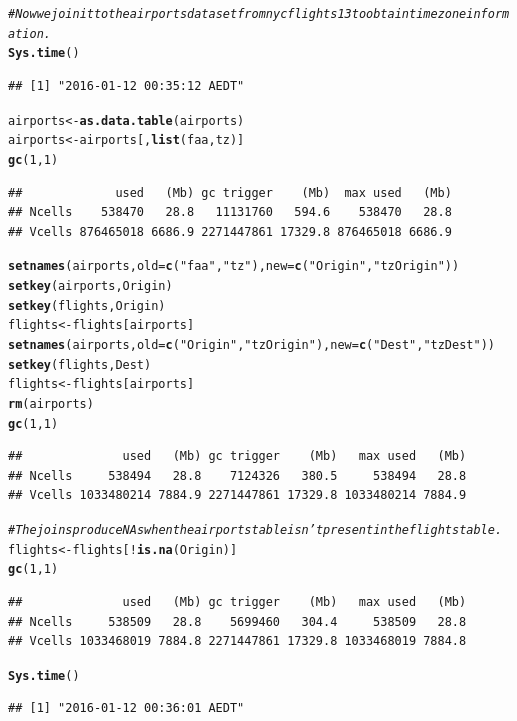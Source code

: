 \documentclass{scrreprt}\usepackage[]{graphicx}\usepackage[]{color}
\makeatletter
\newcommand{\hlnum}[1]{\textcolor[rgb]{0.686,0.059,0.569}{#1}}%
\newcommand{\hlstr}[1]{\textcolor[rgb]{0.192,0.494,0.8}{#1}}%
\newcommand{\hlcom}[1]{\textcolor[rgb]{0.678,0.584,0.686}{\textit{#1}}}%
\newcommand{\hlopt}[1]{\textcolor[rgb]{0,0,0}{#1}}%
\newcommand{\hlstd}[1]{\textcolor[rgb]{0.345,0.345,0.345}{#1}}%
\newcommand{\hlkwb}[1]{\textcolor[rgb]{0.69,0.353,0.396}{#1}}%
\newcommand{\hlkwc}[1]{\textcolor[rgb]{0.333,0.667,0.333}{#1}}%
\newcommand{\hlkwd}[1]{\textcolor[rgb]{0.737,0.353,0.396}{\textbf{#1}}}%
\newenvironment{kframe}{%
 \def\at@end@of@kframe{}%
 \ifinner\ifhmode%
  \def\at@end@of@kframe{\end{minipage}}%
  \begin{minipage}{\columnwidth}%
 \fi\fi%
 \def\FrameCommand##1{\hskip\@totalleftmargin \hskip-\fboxsep
 \colorbox{shadecolor}{##1}\hskip-\fboxsep
     \hskip-\linewidth \hskip-\@totalleftmargin \hskip\columnwidth}%
 \MakeFramed {\advance\hsize-\width
   \@totalleftmargin\z@ \linewidth\hsize
   \@setminipage}}%
 {\par\unskip\endMakeFramed%
 \at@end@of@kframe}
\newenvironment{knitrout}{}{} %
\makeatother
\begin{document}
\begin{knitrout}
\color{fgcolor}\begin{kframe}
\begin{alltt}
\hlcom{# Now we join it to the airports dataset from nycflights13 to obtain time zone information.}
\hlkwd{Sys.time}\hlstd{()}
\end{alltt}
\begin{verbatim}
## [1] "2016-01-12 00:35:12 AEDT"
\end{verbatim}
\begin{alltt}
\hlstd{airports} \hlkwb{<-} \hlkwd{as.data.table}\hlstd{(airports)}
\hlstd{airports} \hlkwb{<-} \hlstd{airports[,}\hlkwd{list}\hlstd{(faa, tz)]}
\hlkwd{gc}\hlstd{(}\hlnum{1}\hlstd{,}\hlnum{1}\hlstd{)}
\end{alltt}
\begin{verbatim}
##             used   (Mb) gc trigger    (Mb)  max used   (Mb)
## Ncells    538470   28.8   11131760   594.6    538470   28.8
## Vcells 876465018 6686.9 2271447861 17329.8 876465018 6686.9
\end{verbatim}
\begin{alltt}
\hlkwd{setnames}\hlstd{(airports,} \hlkwc{old} \hlstd{=} \hlkwd{c}\hlstd{(}\hlstr{"faa"}\hlstd{,} \hlstr{"tz"}\hlstd{),} \hlkwc{new} \hlstd{=} \hlkwd{c}\hlstd{(}\hlstr{"Origin"}\hlstd{,} \hlstr{"tzOrigin"}\hlstd{))}
\hlkwd{setkey}\hlstd{(airports, Origin)}
\hlkwd{setkey}\hlstd{(flights, Origin)}
\hlstd{flights} \hlkwb{<-} \hlstd{flights[airports]}
\hlkwd{setnames}\hlstd{(airports,} \hlkwc{old} \hlstd{=} \hlkwd{c}\hlstd{(}\hlstr{"Origin"}\hlstd{,} \hlstr{"tzOrigin"}\hlstd{),} \hlkwc{new} \hlstd{=} \hlkwd{c}\hlstd{(}\hlstr{"Dest"}\hlstd{,} \hlstr{"tzDest"}\hlstd{))}
\hlkwd{setkey}\hlstd{(flights, Dest)}
\hlstd{flights} \hlkwb{<-} \hlstd{flights[airports]}
\hlkwd{rm}\hlstd{(airports)}
\hlkwd{gc}\hlstd{(}\hlnum{1}\hlstd{,}\hlnum{1}\hlstd{)}
\end{alltt}
\begin{verbatim}
##              used   (Mb) gc trigger    (Mb)   max used   (Mb)
## Ncells     538494   28.8    7124326   380.5     538494   28.8
## Vcells 1033480214 7884.9 2271447861 17329.8 1033480214 7884.9
\end{verbatim}
\begin{alltt}
\hlcom{# The joins produce NAs when the airports table isn't present in the flights table.}
\hlstd{flights} \hlkwb{<-} \hlstd{flights[}\hlopt{!}\hlkwd{is.na}\hlstd{(Origin)]}
\hlkwd{gc}\hlstd{(}\hlnum{1}\hlstd{,}\hlnum{1}\hlstd{)}
\end{alltt}
\begin{verbatim}
##              used   (Mb) gc trigger    (Mb)   max used   (Mb)
## Ncells     538509   28.8    5699460   304.4     538509   28.8
## Vcells 1033468019 7884.8 2271447861 17329.8 1033468019 7884.8
\end{verbatim}
\begin{alltt}
\hlkwd{Sys.time}\hlstd{()}
\end{alltt}
\begin{verbatim}
## [1] "2016-01-12 00:36:01 AEDT"
\end{verbatim}
\end{kframe}
\end{knitrout}
\end{document}
